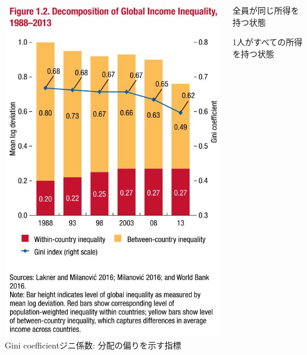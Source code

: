 \begin{frame}[label = WithinCountryInequality]{}
\begin{columns}[T]
\includegraphics[width=\textwidth]{1/InequalityWithinBetweenCountries.jpg}\\
\pause
\footnotesize
Gini coefficientジニ係数: 分配の偏りを示す指標
\begin{description}
\vspace{.0ex}\setlength{\itemsep}{.0ex}\setlength{\baselineskip}{12pt}
\item[最小値は0]	全員が同じ所得を持つ状態
\item[最大値は1]	1人がすべての所得を持つ状態
\end{description}

\end{columns}
\end{frame}
